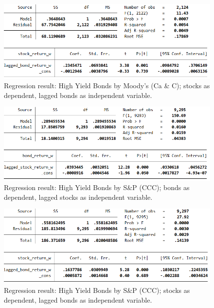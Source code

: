 \begin{figure}[H]
	\centering
	\includegraphics[width=1.0\linewidth]{figures/regression-results/regression-high-yield-ccc-d-moodies-stocks-as-dependent.PNG}
	\caption{Regression result: High Yield Bonds by Moody's (Ca \& C); stocks as dependent, lagged bonds as independent variable. }
	\label{fig:regression-high-yield-moodys-stocks-as-dependent}
\end{figure}

\begin{figure}[H]
	\centering
	\includegraphics[width=1.0\linewidth]{figures/regression-results/regression-high-yield-sandp-bonds-as-dependent.PNG}
	\caption{Regression result: High Yield Bonds by S\&P (CCC); bonds as dependent, lagged stocks as independent variable. }
	\label{fig:regression-high-yield-sandp-bonds-as-dependent}
\end{figure}

\begin{figure}[H]
	\centering
	\includegraphics[width=1.0\linewidth]{figures/regression-results/regression-high-yield-sandp-stocks-as-dependent.PNG}
	\caption{Regression result: High Yield Bonds by S\&P (CCC); stocks as dependent, lagged bonds as independent variable. }
	\label{fig:regression-high-yield-sandp-stocks-as-dependent}
\end{figure}


